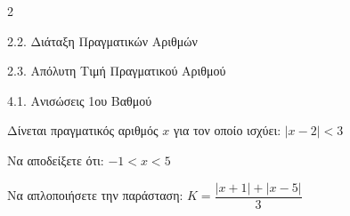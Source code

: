 \begin{ylh}{2}
    \item 2.2. Διάταξη Πραγματικών Αριθμών
    \item 2.3. Απόλυτη Τιμή Πραγματικού Αριθμού
    \item 4.1. Ανισώσεις 1ου Βαθμού
\end{ylh}
Δίνεται πραγματικός αριθμός $x$ για τον οποίο ισχύει: $|x - 2| < 3$
\begin{alist}
\item Να αποδείξετε ότι: $- 1 < x < 5$
\item Να απλοποιήσετε την παράσταση: $K = \dfrac{|x + 1| + |x - 5|}{3}$
\end{alist}

